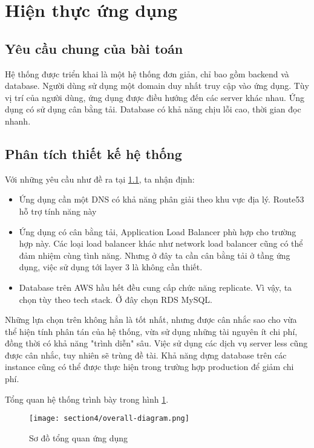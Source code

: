 \section{Hiện thực ứng dụng}
\label{results}

\subsection{Yêu cầu chung của bài toán}
\label{sec4_sub1}
Hệ thống được triển khai là một hệ thống đơn giản, chỉ bao gồm backend và database. Người dùng sử dụng một domain duy nhất truy cập vào ứng dụng. Tùy vị trí của người dùng, ứng dụng được điều hướng đến các server khác nhau. Ứng dụng có sử dụng cân bằng tải. Database có khả năng chịu lỗi cao, thời gian đọc nhanh.

\subsection{Phân tích thiết kế hệ thống}
\label{sec4_sub2}
Với những yêu cầu như đề ra tại \ref{sec4_sub1}, ta nhận định:

\begin{itemize}
    \item Ứng dụng cần một DNS có khả năng phân giải theo khu vực địa lý. Route53 hỗ trợ tính năng này
    \item Ứng dụng có cân bằng tải, Application Load Balancer phù hợp cho trường hợp này. Các loại load balancer khác như network load balancer cũng có thể đảm nhiệm cùng tình năng. Nhưng ở đây ta cần cân bằng tải ở tầng ứng dụng, việc sử dụng tới layer 3 là không cần thiết.
    \item Database trên AWS hầu hết đều cung cấp chức năng replicate. Vì vậy, ta chọn tùy theo tech stack. Ở đây chọn RDS MySQL.
\end{itemize}

Những lựa chọn trên không hẳn là tốt nhất, nhưng được cân nhắc sao cho vừa thể hiện tính phân tán của hệ thống, vừa sử dụng những tài nguyên ít chi phí, đồng thời có khả năng "trình diễn" sâu. Việc sử dụng các dịch vụ server less cũng được cân nhắc, tuy nhiên sẽ trùng đề tài. Khả năng dựng database trên các instance cũng có thể được thực hiện trong trường hợp production để giảm chi phí.

Tổng quan hệ thống trình bày trong hình \ref{fig:sec4-overall-diagram}.

\begin{figure}
    \centering
    \texttt{[image: section4/overall-diagram.png]}
    \caption{Sơ đồ tổng quan ứng dụng}
    \label{fig:sec4-overall-diagram}
\end{figure}


